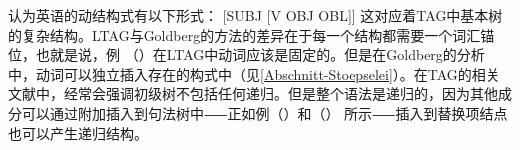  \citet[]{Goldberg95a}认为英语的动结构式有以下形式：
\ea
{}[SUBJ [V OBJ OBL]] 
\z
这对应着TAG中基本树的复杂结构。LTAG与Goldberg的方法的差异在于每一个结构都需要一个词汇锚位，也就是说，例 （）在LTAG中动词应该是固定的。但是在Goldberg的分析中，动词可以独立插入存在的构式中（见\ref{Abschnitt-Stoepselei}）。在TAG的相关文献中，经常会强调初级树不包括任何递归。但是整个语法是递归的，因为其他成分可以通过附加插入到句法树中⸺正如例（）和（） 所示⸺插入到替换项结点也可以产生递归结构。



